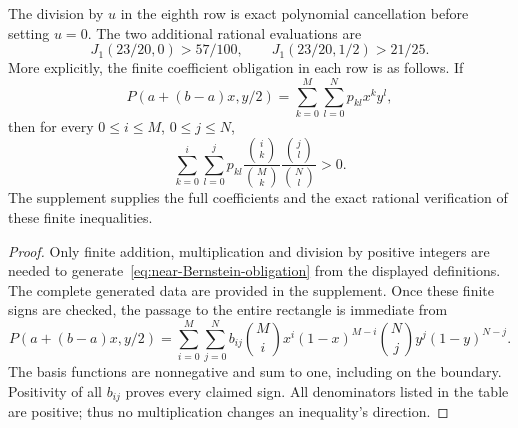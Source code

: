 \begin{lemma}
\begin{center}
\begin{tabular}{@{}llll@{}}
\end{tabular}
\end{center}
The division by $u$ in the eighth row is exact polynomial cancellation before setting $u=0$. The two additional rational evaluations are
\[
 J_1(23/20,0)>57/100,
 \qquad J_1(23/20,1/2)>21/25.
\]
More explicitly, the finite coefficient obligation in each row is as follows. If
\[
 P(a+(b-a)x,y/2)=\sum_{k=0}^M\sum_{l=0}^Np_{kl}x^ky^l,
\]
then for every $0\le i\le M$, $0\le j\le N$,
\begin{equation}\label{eq:near-Bernstein-obligation}
 \sum_{k=0}^i\sum_{l=0}^j
 p_{kl}\frac{\binom{i}{k}}{\binom{M}{k}}
        \frac{\binom{j}{l}}{\binom{N}{l}}>0.
\end{equation}
The supplement supplies the full coefficients and the exact rational verification of these finite inequalities.
\end{lemma}
\begin{proof}
Only finite addition, multiplication and division by positive integers are needed to generate~\eqref{eq:near-Bernstein-obligation} from the displayed definitions. The complete generated data are provided in the supplement. Once these finite signs are checked, the passage to the entire rectangle is immediate from
\[
 P(a+(b-a)x,y/2)=\sum_{i=0}^M\sum_{j=0}^N b_{ij}
 \binom Mi x^i(1-x)^{M-i}\binom Nj y^j(1-y)^{N-j}.
\]
The basis functions are nonnegative and sum to one, including on the boundary. Positivity of all $b_{ij}$ proves every claimed sign. All denominators listed in the table are positive; thus no multiplication changes an inequality's direction.
\end{proof}

